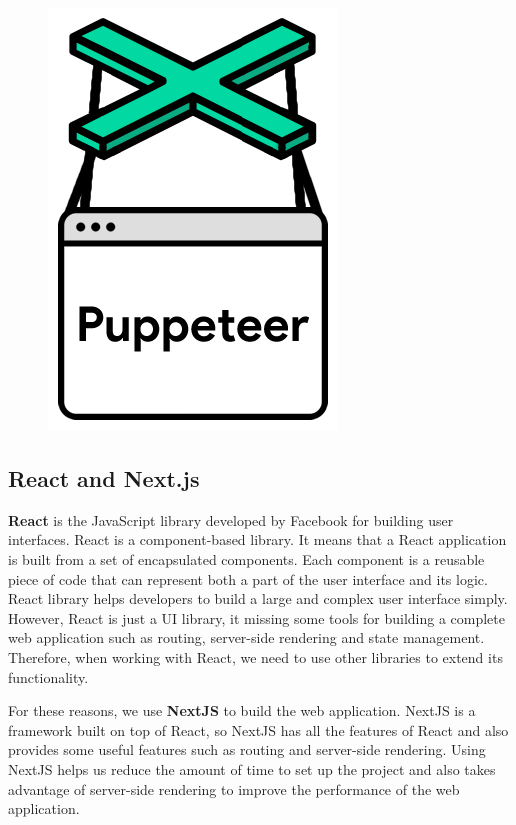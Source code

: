 \begin{figure}[ht]
    \centering 
    \includegraphics[height=0.2\textheight]{../Images/8.Technology_Stack/puppeteer.png}
\end{figure}

\subsection{React and Next.js}
\textbf{React} is the JavaScript library developed by Facebook for building user interfaces. React is a component-based library. It means that a React application is built from a set of encapsulated components. Each component is a reusable piece of code that can represent both a part of the user interface and its logic. React library helps developers to build a large and complex user interface simply. However, React is just a UI library, it missing some tools for building a complete web application such as routing, server-side rendering and state management. Therefore, when working with React, we need to use other libraries to extend its functionality. 

For these reasons, we use \textbf{NextJS} to build the web application. NextJS is a framework built on top of React, so NextJS has all the features of React and also provides some useful features such as routing and server-side rendering. Using NextJS helps us reduce the amount of time to set up the project and also takes advantage of server-side rendering to improve the performance of the web application.

